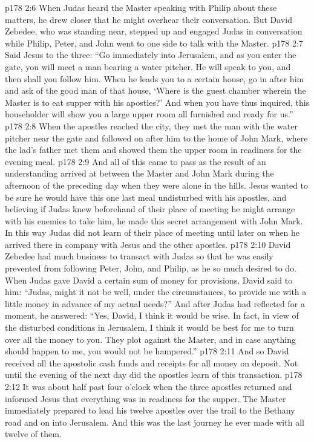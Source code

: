 \vs p178 2:6 When Judas heard the Master speaking with Philip about these matters, he drew closer that he might overhear their conversation. But David Zebedee, who was standing near, stepped up and engaged Judas in conversation while Philip, Peter, and John went to one side to talk with the Master.
\vs p178 2:7 Said Jesus to the three: \textcolor{ubdarkred}{“Go immediately into Jerusalem, and as you enter the gate, you will meet a man bearing a water pitcher. He will speak to you, and then shall you follow him. When he leads you to a certain house, go in after him and ask of the good man of that house, ‘Where is the guest chamber wherein the Master is to eat supper with his apostles?’ And when you have thus inquired, this householder will show you a large upper room all furnished and ready for us.”}
\vs p178 2:8 When the apostles reached the city, they met the man with the water pitcher near the gate and followed on after him to the home of John Mark, where the lad’s father met them and showed them the upper room in readiness for the evening meal.
\vs p178 2:9 And all of this came to pass as the result of an understanding arrived at between the Master and John Mark during the afternoon of the preceding day when they were alone in the hills. Jesus wanted to be sure he would have this one last meal undisturbed with his apostles, and believing if Judas knew beforehand of their place of meeting he might arrange with his enemies to take him, he made this secret arrangement with John Mark. In this way Judas did not learn of their place of meeting until later on when he arrived there in company with Jesus and the other apostles.
\vs p178 2:10 \pc David Zebedee had much business to transact with Judas so that he was easily prevented from following Peter, John, and Philip, as he so much desired to do. When Judas gave David a certain sum of money for provisions, David said to him: “Judas, might it not be well, under the circumstances, to provide me with a little money in advance of my actual needs?” And after Judas had reflected for a moment, he answered: “Yes, David, I think it would be wise. In fact, in view of the disturbed conditions in Jerusalem, I think it would be best for me to turn over all the money to you. They plot against the Master, and in case anything should happen to me, you would not be hampered.”
\vs p178 2:11 And so David received all the apostolic cash funds and receipts for all money on deposit. Not until the evening of the next day did the apostles learn of this transaction.
\vs p178 2:12 \pc It was about half past four o’clock when the three apostles returned and informed Jesus that everything was in readiness for the supper. The Master immediately prepared to lead his twelve apostles over the trail to the Bethany road and on into Jerusalem. And this was the last journey he ever made with all twelve of them.
